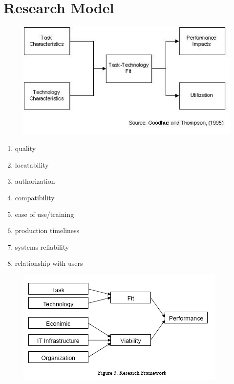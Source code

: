 \section{Research Model}


\begin{figure}[ht]
    \includegraphics[width=0.7\linewidth]{images/methodology/ttf.jpg}\centering
    \caption{\cite{Goodhue1995Task-TechnologyPerformance}}
\end{figure}

\begin{enumerate}
    \item quality
    \item locatability
    \item authorization
    \item compatibility
    \item ease of use/training
    \item production timeliness
    \item systems reliability
    \item relationship with users
\end{enumerate}

\begin{figure}[ht]
    \includegraphics[width=0.7\linewidth]{images/methodology/fvm.jpg}\centering
    \caption{\cite{Liang2007AdoptionModel}}
\end{figure}
